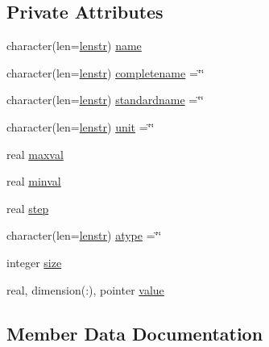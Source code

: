 \subsection*{Private Attributes}
\begin{DoxyCompactItemize}
\item 
character(len=\mbox{\hyperlink{namespacencdflib_a7d52315e1d9f473093f6f8fa245ea084}{lenstr}}) \mbox{\hyperlink{structncdflib_1_1t__axiscf_a38e63c74e1fb991a163c4b2c2b782f7a}{name}}
\item 
character(len=\mbox{\hyperlink{namespacencdflib_a7d52315e1d9f473093f6f8fa245ea084}{lenstr}}) \mbox{\hyperlink{structncdflib_1_1t__axiscf_ae7106d2ed2485a5b8436bb4325d14c1b}{completename}} =\char`\"{}\char`\"{}
\item 
character(len=\mbox{\hyperlink{namespacencdflib_a7d52315e1d9f473093f6f8fa245ea084}{lenstr}}) \mbox{\hyperlink{structncdflib_1_1t__axiscf_a44b13ad401b8697a9da24aad02c63ffc}{standardname}} =\char`\"{}\char`\"{}
\item 
character(len=\mbox{\hyperlink{namespacencdflib_a7d52315e1d9f473093f6f8fa245ea084}{lenstr}}) \mbox{\hyperlink{structncdflib_1_1t__axiscf_aa9c3b79b06d7698e0cfec143deef7ee1}{unit}} =\char`\"{}\char`\"{}
\item 
real \mbox{\hyperlink{structncdflib_1_1t__axiscf_a9b174cbf03d1f830ba8cc65904de170d}{maxval}}
\item 
real \mbox{\hyperlink{structncdflib_1_1t__axiscf_a027e0fa7971bbdf654b4134d30eff7a7}{minval}}
\item 
real \mbox{\hyperlink{structncdflib_1_1t__axiscf_a94bbda5d5d16f178821dfea1efabd344}{step}}
\item 
character(len=\mbox{\hyperlink{namespacencdflib_a7d52315e1d9f473093f6f8fa245ea084}{lenstr}}) \mbox{\hyperlink{structncdflib_1_1t__axiscf_acd7940201d7767fb8cc6884b88443398}{atype}} =\char`\"{}\char`\"{}
\item 
integer \mbox{\hyperlink{structncdflib_1_1t__axiscf_a1a7f9e75b51fbf914037ae117043545c}{size}}
\item 
real, dimension(\+:), pointer \mbox{\hyperlink{structncdflib_1_1t__axiscf_abae2dffd9b0944590c75efc38e700e97}{value}}
\end{DoxyCompactItemize}


\subsection{Member Data Documentation}
\mbox{\label{structncdflib_1_1t__axiscf_acd7940201d7767fb8cc6884b88443398}} 
